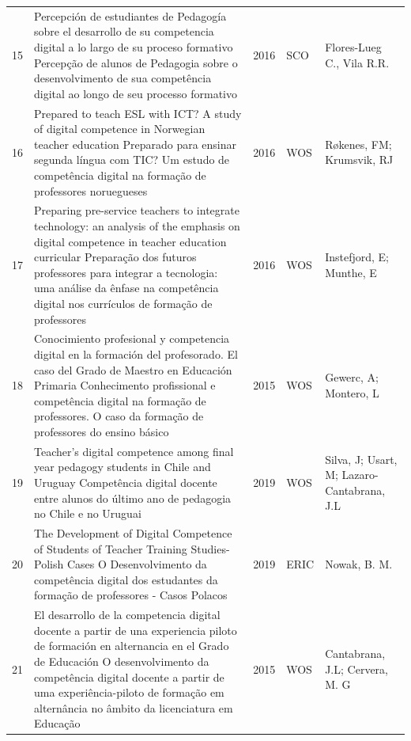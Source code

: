 \documentclass[portuguese]{textolivre}
\begin{document}
\begin{footnotesize}
\begin{longtable}{
    @{}l >{\raggedright\arraybackslash}p{}
    ll
    >{\raggedright\arraybackslash}p{}@{}
    }
15 & Percepción de estudiantes de Pedagogía sobre el desarrollo de su competencia digital a lo largo de su proceso formativo \newline
Percepção de alunos de Pedagogia sobre o desenvolvimento de sua competência digital ao longo de seu processo formativo & 2016 & SCO	& Flores-Lueg C., Vila R.R.\\
16 & Prepared to teach ESL with ICT? A study of digital competence in Norwegian teacher education \newline
Preparado para ensinar segunda língua com TIC? Um estudo de competência digital na formação de professores noruegueses & 2016 & WOS & Røkenes, FM; Krumsvik, RJ \\
17 & Preparing pre-service teachers to integrate technology: an analysis of the emphasis on digital competence in teacher education curricular \newline
Preparação dos futuros professores para integrar a tecnologia: uma análise da ênfase na competência digital nos currículos de formação de professores & 2016 & WOS & Instefjord, E; Munthe, E \\
18 & Conocimiento profesional y competencia digital en la formación del profesorado. El caso del Grado de Maestro en Educación Primaria \newline
Conhecimento profissional e competência digital na formação de professores. O caso da formação de professores do ensino básico & 2015 & WOS & Gewerc, A; Montero, L \\
19 & Teacher's digital competence among final year pedagogy students in Chile and Uruguay \newline 
Competência digital docente entre alunos do último ano de pedagogia no Chile e no Uruguai	& 2019 & WOS & Silva, J; Usart, M; Lazaro-Cantabrana, J.L \\
20 & The Development of Digital Competence of Students of Teacher Training Studies-Polish Cases \newline
O Desenvolvimento da competência digital dos estudantes da formação de professores - Casos Polacos & 2019 & ERIC & Nowak, B. M. \\
21 & El desarrollo de la competencia digital docente a partir de una experiencia piloto de formación en alternancia en el Grado de Educación \newline
O desenvolvimento da competência digital docente a partir de uma experiência-piloto de formação em alternância no âmbito da licenciatura em Educação & 2015 & WOS & Cantabrana, J.L; Cervera, M. G \\

\end{longtable}
\end{footnotesize}
\end{document}
